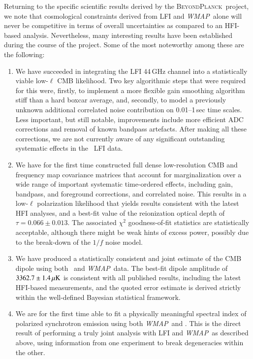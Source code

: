 \documentclass[onecolumn]{aa}
\def\WMAP{\emph{WMAP}}
\newcommand{\BP}{\textsc{BeyondPlanck}}
\begin{document}
Returning to the specific scientific results derived by the
\BP\ project, we note that cosmological constraints derived from LFI
and \WMAP\ alone will never be competitive in terms of overall
uncertainties as compared to an HFI-based analysis. Nevertheless, many
interesting results have been established during the course of the
project. Some of the most noteworthy among these are the
following:
\begin{enumerate}
  \item We have succeeded in integrating the LFI 44\,GHz channel into
    a statistically viable low-$\ell$ CMB likelihood. Two key
    algorithmic steps that were required for this were, firstly, to
    implement a more flexible gain smoothing algorithm stiff than a
    hard boxcar average, and, secondly, to model a previously unknown
    additional correlated noise contribution on 0.01--1\,sec time
    scales. Less important, but still notable, improvements include
    more efficient ADC corrections and removal of known bandpass
    artefacts. After making all these corrections, we are not
    currently aware of any significant outstanding systematic effects
    in the \Planck\ LFI data.
  \item We have for the first time constructed full dense
    low-resolution CMB and frequency map covariance matrices that
    account for marginalization over a wide range of important
    systematic time-ordered effects, including gain, bandpass, and
    foreground corrections, and correlated noise. This results in a
    low-$\ell$ polarization likelihood that yields results consistent
    with the latest HFI analyses, and a best-fit value of the
    reionization optical depth of
    $\tau=0.066\pm0.013$. The associated $\chi^2$
    goodness-of-fit statistics are statistically acceptable, although
    there might be weak hints of excess power, possibly due to the
    break-down of the $1/f$ noise model.
  \item We have produced a statistically consistent and joint estimate
    of the CMB dipole using both \Planck\ and \WMAP\ data. The
    best-fit dipole amplitude of $3362.7\pm1.4\muK$ is consistent with
    all published results, including the latest HFI-based
    measurements, and the quoted error estimate is derived strictly
    within the well-defined Bayesian statistical framework.
  \item We are for the first time able to fit a physically
    meaningful spectral index of polarized synchrotron emission using
    both \WMAP\ and \Planck. This is the direct result of performing a
    truly joint analysis with LFI and \WMAP\, as described above,
    using information from one experiment to break degeneracies within
    the other.
\end{enumerate}
\end{document}
